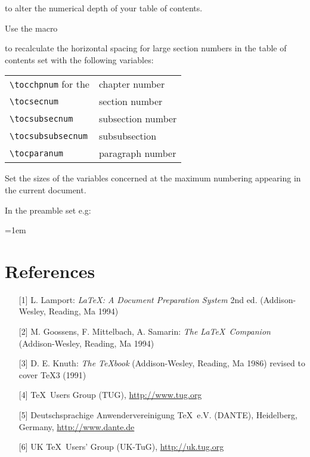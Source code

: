 \documentclass[graybox,square]{svmono}
\begin{document}
\begin{sloppy}
\cprotect\boxtext{\verb|\setcounter{tocdepth}{number}|}

to alter the numerical depth of your table of contents.

Use the macro

\cprotect\boxtext{\verb|\calctocindent|}

to recalculate the horizontal spacing for large section numbers in the table of contents set with the following variables:

\begin{tabular}{l@{\qquad}l}
\verb|\tocchpnum| for the & chapter number\\
\verb|\tocsecnum| & section number\\
\verb|\tocsubsecnum| & subsection number\\
\verb|\tocsubsubsecnum| & subsubsection\\
\verb|\tocparanum| & paragraph number\\
\end{tabular}

Set the sizes of the variables concerned at the maximum numbering appearing in the current document.

In the preamble set e.g:

\cprotect{}


\parskip=1em

\section*{References}

\begin{enumerate}
\item[{[1]}] L. Lamport: \textit{\LaTeX: A Document Preparation System} 2nd ed. (Addison-Wesley, Reading, Ma 1994)
\item[{[2]}] M. Goossens, F. Mittelbach, A. Samarin: \textit{The \LaTeX\ Companion} (Addison-Wesley, Reading, Ma 1994)
\item[{[3]}] D. E. Knuth: \textit{The \TeX book} (Addison-Wesley, Reading, Ma 1986) revised to cover \TeX3 (1991)
\item[{[4]}] \TeX\ Users Group (TUG), \url{http://www.tug.org}
\item[{[5]}] Deutschsprachige Anwendervereinigung \TeX\ e.V. (DANTE), Heidelberg, Germany, \url{http://www.dante.de}
\item[{[6]}] UK \TeX\ Users' Group (UK-TuG), \url{http://uk.tug.org}
\end{enumerate}
\end{sloppy}
\end{document}
